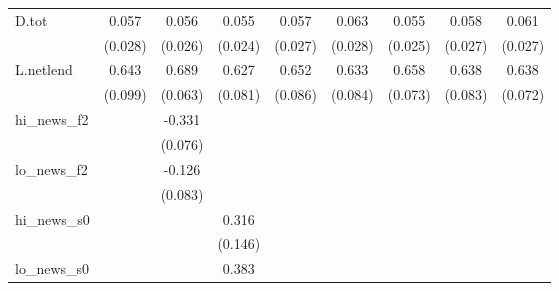 {\begin{tabular}{l*{8}{c}}
D.tot       &       0.057\sym{**} &       0.056\sym{**} &       0.055\sym{**} &       0.057\sym{**} &       0.063\sym{**} &       0.055\sym{**} &       0.058\sym{**} &       0.061\sym{**} \\
            &     (0.028)         &     (0.026)         &     (0.024)         &     (0.027)         &     (0.028)         &     (0.025)         &     (0.027)         &     (0.027)         \\
\addlinespace
L.netlend   &       0.643\sym{***}&       0.689\sym{***}&       0.627\sym{***}&       0.652\sym{***}&       0.633\sym{***}&       0.658\sym{***}&       0.638\sym{***}&       0.638\sym{***}\\
            &     (0.099)         &     (0.063)         &     (0.081)         &     (0.086)         &     (0.084)         &     (0.073)         &     (0.083)         &     (0.072)         \\
\addlinespace
hi\_news\_f2  &                     &      -0.331\sym{***}&                     &                     &                     &                     &                     &                     \\
            &                     &     (0.076)         &                     &                     &                     &                     &                     &                     \\
\addlinespace
lo\_news\_f2  &                     &      -0.126         &                     &                     &                     &                     &                     &                     \\
            &                     &     (0.083)         &                     &                     &                     &                     &                     &                     \\
\addlinespace
hi\_news\_s0  &                     &                     &       0.316\sym{**} &                     &                     &                     &                     &                     \\
            &                     &                     &     (0.146)         &                     &                     &                     &                     &                     \\
\addlinespace
lo\_news\_s0  &                     &                     &       0.383\sym{***}&                     &                     &                     &                     &                     \\

\end{tabular}}

